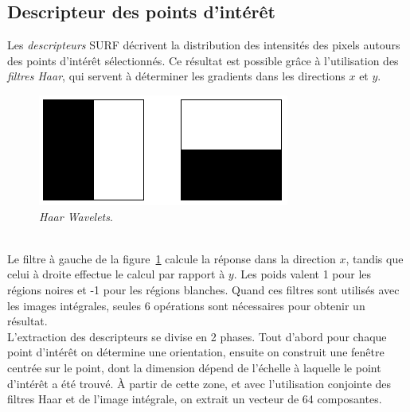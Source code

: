\documentclass[a4paper,11pt]{report}
\begin{document}
\subsection{Descripteur des points d'intérêt}
Les \textit{descripteurs} SURF décrivent la distribution des intensités des pixels autours des points d'intérêt sélectionnés. Ce résultat est possible grâce à l'utilisation des \textit{filtres Haar}, qui servent à déterminer les gradients dans les directions $x$ et $y$.
\begin{figure}[ht]
\centering
\includegraphics[scale=0.3]{figure7.png}
\caption{\textit{Haar Wavelets}.}
\label{fig7}
\end{figure}
\\Le filtre à gauche de la figure~\ref{fig7} calcule la réponse dans la direction $x$, tandis que celui à droite effectue le calcul par rapport à $y$. Les poids valent 1 pour les régions noires et -1 pour les régions blanches. Quand ces filtres sont utilisés avec les images intégrales, seules 6 opérations sont nécessaires pour obtenir un résultat. 
\\L'extraction des  descripteurs se divise en 2 phases. Tout d'abord pour chaque point d'intérêt on détermine une orientation, ensuite on construit une fenêtre centrée sur le point, dont la dimension dépend de l'échelle à laquelle le point d'intérêt a été trouvé. \`A partir de cette zone, et avec l'utilisation conjointe des filtres Haar et de l'image intégrale, on extrait un vecteur de 64 composantes.
\end{document}

